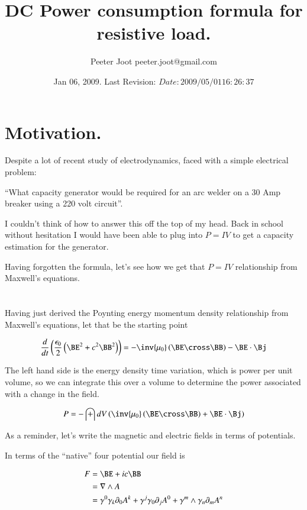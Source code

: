 \documentclass{article}
\title{ DC Power consumption formula for resistive load. }
\author{Peeter Joot \quad peeter.joot@gmail.com}
\date{ Jan 06, 2009.  Last Revision: $Date: 2009/05/01 16:26:37 $ }
\begin{document}
\maketitle{}

\section{ Motivation. }

Despite a lot of recent study of electrodynamics, faced with a simple electrical problem:

``What capacity generator would be required for an arc welder on a 30 Amp breaker using a 220 volt circuit''.

I couldn't think of how to answer this off the top of my head.  Back in school without hesitation I would have
been able to plug into $P = I V$ to get a capacity estimation for the generator.

Having forgotten the formula, let's see how we get that $P = I V$ relationship from Maxwell's equations.

\section{}

Having just derived the Poynting energy momentum density relationship from Maxwell's equations, let that be the starting
point

\begin{align*}
\frac{d}{dt}\left(\frac{\epsilon_0}{2}\left(\BE^2 + c^2\BB^2 \right) \right) = - \inv{\mu_0} \left(\BE \cross \BB \right) - \BE \cdot \Bj
\end{align*}

The left hand side is the energy density time variation, which is power per unit volume, so we can integrate this
over a volume to determine the power associated with a change in the field.

\begin{align*}
P = -\int dV \left( \inv{\mu_0} \left(\BE \cross \BB \right) + \BE \cdot \Bj \right)
\end{align*}

As a reminder, let's write the magnetic and electric fields in terms of potentials.

In terms of the ``native'' four potential our field is

\begin{align*}
F 
&= \BE + ic \BB \\
&= \grad \wedge A \\
&= \gamma^0 \gamma_k \partial_0 A^k + \gamma^j \gamma_0 \partial_j A^0 + \gamma^m \wedge \gamma_n \partial_m A^n \\
\end{align*}
\end{document}
